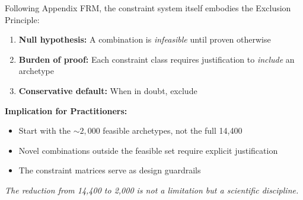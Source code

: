 \begin{tcolorbox}[colback=red!5!white, colframe=red!75!black,
    title=\textbf{Methodological Note: XVIII Exclusion Principle for Reduction}]

Following Appendix FRM, the constraint system itself embodies the Exclusion Principle:

\begin{enumerate}[nosep]
    \item \textbf{Null hypothesis:} A combination is \textit{infeasible} until proven otherwise
    \item \textbf{Burden of proof:} Each constraint class requires justification to \textit{include} an archetype
    \item \textbf{Conservative default:} When in doubt, exclude
\end{enumerate}

\textbf{Implication for Practitioners:}
\begin{itemize}[nosep]
    \item Start with the $\sim 2{,}000$ feasible archetypes, not the full 14,400
    \item Novel combinations outside the feasible set require explicit justification
    \item The constraint matrices serve as design guardrails
\end{itemize}

\textit{The reduction from 14,400 to 2,000 is not a limitation but a scientific discipline.}
\end{tcolorbox}

